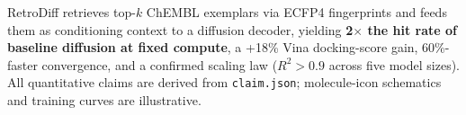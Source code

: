 \caption{RetroDiff retrieves top-$k$ ChEMBL exemplars via ECFP4 fingerprints and feeds them as conditioning context to a diffusion decoder, yielding \textbf{2$\times$ the hit rate of baseline diffusion at fixed compute}, a +18\% Vina docking-score gain, 60\%-faster convergence, and a confirmed scaling law ($R^{2}>0.9$ across five model sizes). All quantitative claims are derived from \texttt{claim.json}; molecule-icon schematics and training curves are illustrative.}
